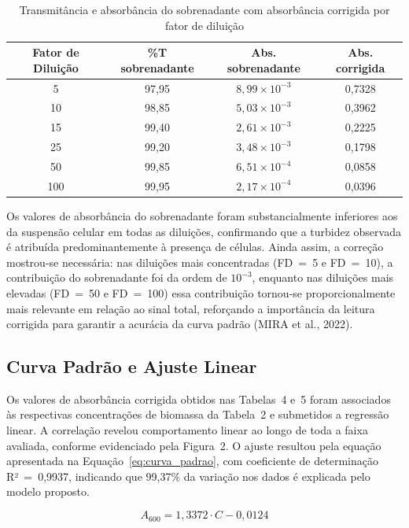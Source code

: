 \begin{table}[H]
\caption{Transmitância e absorbância do sobrenadante com absorbância corrigida por fator de diluição}
\centering
\begin{tabular}{cccc}
\toprule
\textbf{Fator de Diluição} &
\textbf{\%T sobrenadante} &
\textbf{Abs. sobrenadante} &
\textbf{Abs. corrigida} \\
\midrule
5   & 97,95 & $8{,}99 \times 10^{-3}$ & 0,7328 \\
10  & 98,85 & $5{,}03 \times 10^{-3}$ & 0,3962 \\
15  & 99,40 & $2{,}61 \times 10^{-3}$ & 0,2225 \\
25  & 99,20 & $3{,}48 \times 10^{-3}$ & 0,1798 \\
50  & 99,85 & $6{,}51 \times 10^{-4}$ & 0,0858 \\
100 & 99,95 & $2{,}17 \times 10^{-4}$ & 0,0396 \\
\bottomrule
\end{tabular}
\end{table}

Os valores de absorbância do sobrenadante foram substancialmente inferiores aos da suspensão celular em todas as diluições, confirmando que a turbidez observada é atribuída predominantemente à presença de células. Ainda assim, a correção mostrou-se necessária: nas diluições mais concentradas (FD~=~5 e FD~=~10), a contribuição do sobrenadante foi da ordem de $10^{-3}$, enquanto nas diluições mais elevadas (FD~=~50 e FD~=~100) essa contribuição tornou-se proporcionalmente mais relevante em relação ao sinal total, reforçando a importância da leitura corrigida para garantir a acurácia da curva padrão (MIRA et al., 2022).

\subsection{Curva Padrão e Ajuste Linear}

Os valores de absorbância corrigida obtidos nas Tabelas~4 e~5 foram associados às respectivas concentrações de biomassa da Tabela~2 e submetidos a regressão linear. A correlação revelou comportamento linear ao longo de toda a faixa avaliada, conforme evidenciado pela Figura~2. O ajuste resultou pela equação apresentada na Equação~\ref{eq:curva_padrao}, com coeficiente de determinação R²~=~0,9937, indicando que 99,37\% da variação nos dados é explicada pelo modelo proposto.

\begin{equation}
    A_{600} = 1{,}3372 \cdot C - 0{,}0124
    \label{eq:curva_padrao}
\end{equation}

